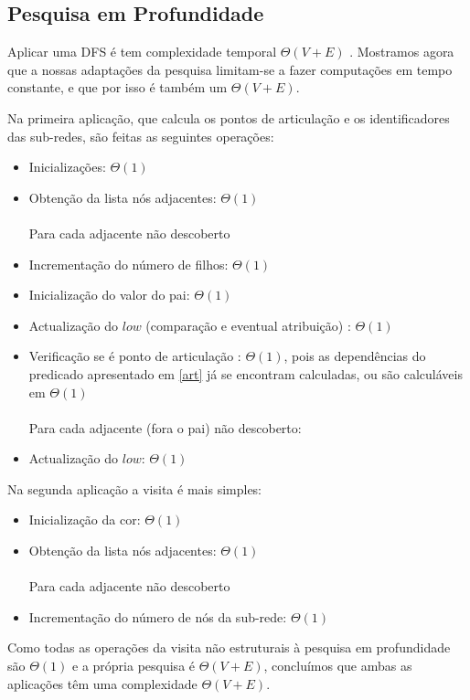 \documentclass[a4paper, 12pt, conference, portuguese]{ieeeconf}
\begin{document}
\subsection{Pesquisa em Profundidade}
Aplicar uma DFS é tem complexidade temporal $\Theta(V + E)$ \cite{cormen}.
Mostramos agora que a nossas adaptações da pesquisa limitam-se a fazer computações
em tempo constante, e que por isso é também um $\Theta(V + E)$.

Na primeira aplicação, que calcula os pontos de articulação e os identificadores
das sub-redes, são feitas as seguintes operações:
\begin{itemize}
  \item Inicializações: $\Theta(1)$
  \item Obtenção da lista nós adjacentes: $\Theta(1)$\\ \\
  Para cada adjacente não descoberto
  \item Incrementação do número de filhos: $\Theta(1)$
  \item Inicialização do valor do pai: $\Theta(1)$
  \item Actualização do $low$ (comparação e eventual atribuição) : $\Theta(1)$
  \item Verificação se é ponto de articulação : $\Theta(1)$, pois as
    dependências do predicado apresentado em \ref{art} já se encontram
    calculadas, ou são calculáveis em $\Theta(1)$ \\ \\

  Para cada adjacente (fora o pai) não descoberto:
  \item Actualização do $low$: $\Theta(1)$
\end{itemize}

Na segunda aplicação a visita é mais simples:
\begin{itemize}
  \item Inicialização da cor: $\Theta(1)$
  \item Obtenção da lista nós adjacentes: $\Theta(1)$\\ \\
  Para cada adjacente não descoberto
  \item Incrementação do número de nós da sub-rede: $\Theta(1)$
\end{itemize}

Como todas as operações da visita não estruturais à pesquisa em profundidade são
$\Theta(1)$ e a própria pesquisa é $\Theta(V + E)$, concluímos que ambas as
aplicações têm uma complexidade $\Theta(V + E)$.
\end{document}
